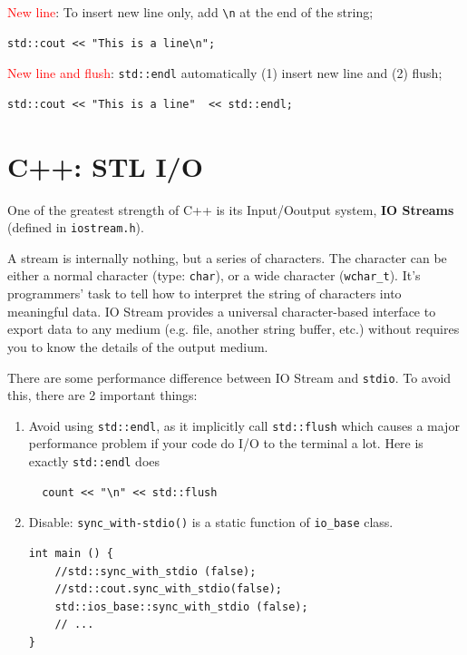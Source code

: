 \textcolor{red}{New line}: To insert new line only, add \verb!\n! at the end of
the string;
\begin{verbatim}
std::cout << "This is a line\n";
\end{verbatim}

\textcolor{red}{New line and flush}: 
\verb!std::endl! automatically (1) insert new line and (2) flush;
\begin{verbatim}
std::cout << "This is a line"  << std::endl;
\end{verbatim}

\section{C++: STL I/O}
\label{sec:IO_STL}

One of the greatest strength of C++ is its Input/Ooutput system, {\bf IO
Streams} (defined in \verb!iostream.h!).

A stream is internally nothing, but a series of characters. The character can be
either a normal character (type: \verb!char!), or a wide character
(\verb!wchar_t!). It's programmers' task to tell how to interpret the string of
characters into meaningful data. IO Stream provides a universal character-based
interface to export data to any medium (e.g. file, another string buffer, etc.)
without requires you to know the details of the output medium.

\begin{mdframed}
There are some performance difference between IO Stream and \verb!stdio!. To
avoid this, there are 2 important things:
\begin{enumerate}
  \item  Avoid using \verb!std::endl!, as it
  implicitly call \verb!std::flush! which causes a major performance problem if
  your code do I/O to the terminal a lot. Here is exactly \verb!std::endl! does 
  \begin{verbatim}
  count << "\n" << std::flush
  \end{verbatim}
  
  \item Disable: \verb!sync_with-stdio()! is a static function of \verb!io_base!
  class.
  \begin{verbatim}
int main () {
    //std::sync_with_stdio (false);
    //std::cout.sync_with_stdio(false);
    std::ios_base::sync_with_stdio (false);
    // ...
}
  \end{verbatim}
\end{enumerate}
\end{mdframed}

